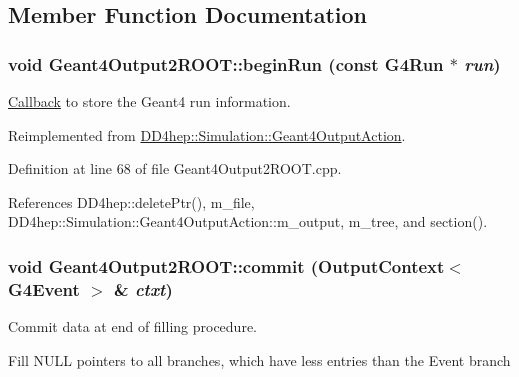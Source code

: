 \subsection{Member Function Documentation}
\hypertarget{class_d_d4hep_1_1_simulation_1_1_geant4_output2_r_o_o_t_a03f3906460b18ff0b31b9c0f9060d93d}{
\subsubsection[{beginRun}]{\setlength{\rightskip}{0pt plus 5cm}void Geant4Output2ROOT::beginRun (const G4Run $\ast$ {\em run})}}
\label{class_d_d4hep_1_1_simulation_1_1_geant4_output2_r_o_o_t_a03f3906460b18ff0b31b9c0f9060d93d}


\hyperlink{class_d_d4hep_1_1_callback}{Callback} to store the Geant4 run information. 

Reimplemented from \hyperlink{class_d_d4hep_1_1_simulation_1_1_geant4_output_action_afc8b13d72433d8f917555e952e1ce528}{DD4hep::Simulation::Geant4OutputAction}.

Definition at line 68 of file Geant4Output2ROOT.cpp.

References DD4hep::deletePtr(), m\_\-file, DD4hep::Simulation::Geant4OutputAction::m\_\-output, m\_\-tree, and section().\hypertarget{class_d_d4hep_1_1_simulation_1_1_geant4_output2_r_o_o_t_a06090a17c7d266dcdfb7b2b180aeaffe}{
\subsubsection[{commit}]{\setlength{\rightskip}{0pt plus 5cm}void Geant4Output2ROOT::commit ({\bf OutputContext}$<$ G4Event $>$ \& {\em ctxt})}}
\label{class_d_d4hep_1_1_simulation_1_1_geant4_output2_r_o_o_t_a06090a17c7d266dcdfb7b2b180aeaffe}


Commit data at end of filling procedure. 

Fill NULL pointers to all branches, which have less entries than the Event branch 

